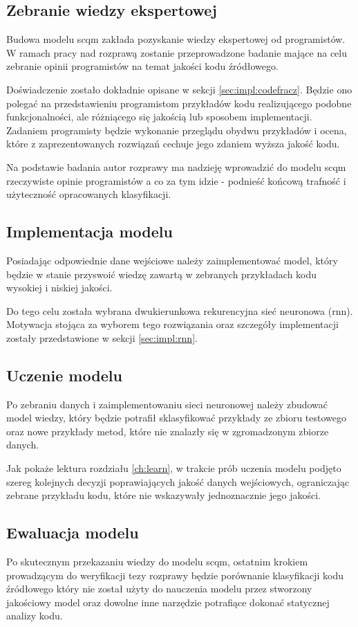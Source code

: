 \documentclass[12pt]{report}
\begin{document}
\subsection{Zebranie wiedzy ekspertowej}
Budowa modelu \gls{scqm} zakłada pozyskanie wiedzy ekspertowej od programistów. W ramach pracy nad rozprawą zostanie przeprowadzone badanie mające na celu zebranie opinii programistów na temat jakości kodu źródłowego.

Doświadczenie zostało dokładnie opisane w sekcji \ref{sec:impl:codefracz}. Będzie ono polegać na przedstawieniu programistom przykładów kodu realizującego podobne funkcjonalności, ale różniącego się jakością lub sposobem implementacji. Zadaniem programisty będzie wykonanie przeglądu obydwu przykładów i ocena, które z zaprezentowanych rozwiązań cechuje jego zdaniem wyższa jakość kodu.

Na podstawie badania autor rozprawy ma nadzieję wprowadzić do modelu \gls{scqm} rzeczywiste opinie programistów a co za tym idzie - podnieść końcową trafność i użyteczność opracowanych klasyfikacji.

\subsection{Implementacja modelu}
Posiadając odpowiednie dane wejściowe należy zaimplementować model, który będzie w stanie przyswoić wiedzę zawartą w zebranych przykładach kodu wysokiej i niskiej jakości.

Do tego celu została wybrana dwukierunkowa rekurencyjna sieć neuronowa (\gls{rnn}). Motywacja stojąca za wyborem tego rozwiązania oraz szczegóły implementacji zostały przedstawione w sekcji \ref{sec:impl:rnn}.

\subsection{Uczenie modelu}
Po zebraniu danych i zaimplementowaniu sieci neuronowej należy zbudować model wiedzy, który będzie potrafił sklasyfikować przykłady ze zbioru testowego oraz nowe przykłady metod, które nie znalazły się w zgromadzonym zbiorze danych.

Jak pokaże lektura rozdziału \ref{ch:learn}, w trakcie prób uczenia modelu podjęto szereg kolejnych decyzji poprawiających jakość danych wejściowych, ograniczając zebrane przykładu kodu, które nie wskazywały jednoznacznie jego jakości.

\subsection{Ewaluacja modelu}
Po skutecznym przekazaniu wiedzy do modelu \gls{scqm}, ostatnim krokiem prowadzącym do weryfikacji tezy rozprawy będzie porównanie klasyfikacji kodu źródłowego który nie został użyty do nauczenia modelu przez stworzony jakościowy model oraz dowolne inne narzędzie potrafiące dokonać statycznej analizy kodu.
\end{document}

